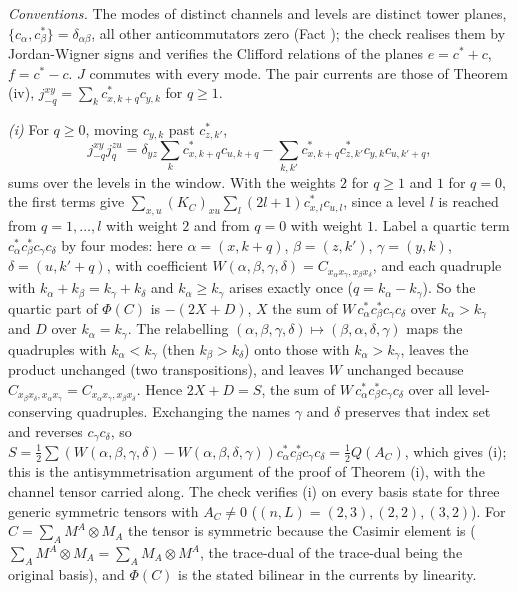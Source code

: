 \emph{Conventions.} The modes of distinct channels and levels are distinct tower planes, $\{c_{\alpha}, c^{*}_{\beta}\} = \delta_{\alpha\beta}$, all other anticommutators zero (Fact ); the check realises them by Jordan-Wigner signs and verifies the Clifford relations of the planes $e = c^{*} + c$, $f = c^{*} - c$. $J$ commutes with every mode. The pair currents are those of Theorem (iv), $j^{xy}_{-q} = \sum_{k}c^{*}_{x,k+q}c_{y,k}$ for $q \ge 1$.

\emph{(i)} For $q \ge 0$, moving $c_{y,k}$ past $c^{*}_{z,k'}$,
\[
j^{xy}_{-q}j^{zu}_{q} = \delta_{yz}\sum_{k}c^{*}_{x,k+q}c_{u,k+q} - \sum_{k,k'}c^{*}_{x,k+q}c^{*}_{z,k'}c_{y,k}c_{u,k'+q},
\]
sums over the levels in the window. With the weights $2$ for $q \ge 1$ and $1$ for $q = 0$, the first terms give $\sum_{x,u}(K_{C})_{xu}\sum_{l}(2l + 1)c^{*}_{x,l}c_{u,l}$, since a level $l$ is reached from $q = 1, \dots, l$ with weight $2$ and from $q = 0$ with weight $1$. Label a quartic term $c^{*}_{\alpha}c^{*}_{\beta}c_{\gamma}c_{\delta}$ by four modes: here $\alpha = (x, k + q)$, $\beta = (z, k')$, $\gamma = (y, k)$, $\delta = (u, k' + q)$, with coefficient $W(\alpha, \beta, \gamma, \delta) = C_{x_{\alpha}x_{\gamma}, x_{\beta}x_{\delta}}$, and each quadruple with $k_{\alpha} + k_{\beta} = k_{\gamma} + k_{\delta}$ and $k_{\alpha} \ge k_{\gamma}$ arises exactly once ($q = k_{\alpha} - k_{\gamma}$). So the quartic part of $\Phi(C)$ is $-(2X + D)$, $X$ the sum of $W\,c^{*}_{\alpha}c^{*}_{\beta}c_{\gamma}c_{\delta}$ over $k_{\alpha} > k_{\gamma}$ and $D$ over $k_{\alpha} = k_{\gamma}$. The relabelling $(\alpha, \beta, \gamma, \delta) \mapsto (\beta, \alpha, \delta, \gamma)$ maps the quadruples with $k_{\alpha} < k_{\gamma}$ (then $k_{\beta} > k_{\delta}$) onto those with $k_{\alpha} > k_{\gamma}$, leaves the product unchanged (two transpositions), and leaves $W$ unchanged because $C_{x_{\beta}x_{\delta}, x_{\alpha}x_{\gamma}} = C_{x_{\alpha}x_{\gamma}, x_{\beta}x_{\delta}}$. Hence $2X + D = S$, the sum of $W\,c^{*}_{\alpha}c^{*}_{\beta}c_{\gamma}c_{\delta}$ over all level-conserving quadruples. Exchanging the names $\gamma$ and $\delta$ preserves that index set and reverses $c_{\gamma}c_{\delta}$, so $S = \tfrac12\sum(W(\alpha, \beta, \gamma, \delta) - W(\alpha, \beta, \delta, \gamma))c^{*}_{\alpha}c^{*}_{\beta}c_{\gamma}c_{\delta} = \tfrac12 Q(A_{C})$, which gives (i); this is the antisymmetrisation argument of the proof of Theorem (i), with the channel tensor carried along. The check verifies (i) on every basis state for three generic symmetric tensors with $A_{C} \ne 0$ ($(n, L) = (2, 3), (2, 2), (3, 2)$). For $C = \sum_{A}M^{A}\otimes M_{A}$ the tensor is symmetric because the Casimir element is ($\sum_{A}M^{A}\otimes M_{A} = \sum_{A}M_{A}\otimes M^{A}$, the trace-dual of the trace-dual being the original basis), and $\Phi(C)$ is the stated bilinear in the currents by linearity.

